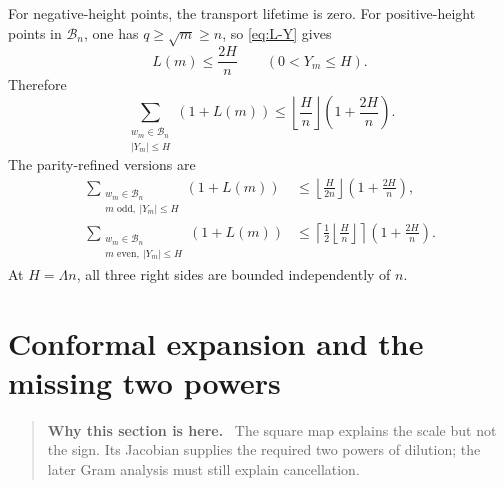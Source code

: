 \documentclass[11pt]{article}
\theoremstyle{definition}
\theoremstyle{remark}
\newcommand{\1}{\mathbf{1}}
\newenvironment{motivation}
  {\begin{quote}\small\color{ovvogray}\textbf{Why this section is here.}\ }
  {\end{quote}}
\begin{document}
For negative-height points, the transport lifetime is zero.  For
positive-height points in $\mathscr B_n$, one has
$q\ge\sqrt m\ge n$, so \cref{eq:L-Y} gives
\begin{equation}
 L(m)\le\frac{2H}{n}
 \qquad(0<Y_m\le H).
 \label{eq:L-H-n}
\end{equation}
Therefore
\begin{equation}
 \boxed{
 \sum_{\substack{w_m\in\mathscr B_n\\|Y_m|\le H}}
 (1+L(m))
 \le
 \left\lfloor\frac{H}{n}\right\rfloor
 \left(1+\frac{2H}{n}\right).
 }
 \label{eq:space-time-budget}
\end{equation}
The parity-refined versions are
\begin{align}
 \sum_{\substack{w_m\in\mathscr B_n\\m\text{ odd},\ |Y_m|\le H}}
 (1+L(m))
 &\le
 \left\lfloor\frac{H}{2n}\right\rfloor
 \left(1+\frac{2H}{n}\right),
 \label{eq:odd-space-time-budget}\\
 \sum_{\substack{w_m\in\mathscr B_n\\m\text{ even},\ |Y_m|\le H}}
 (1+L(m))
 &\le
 \left\lceil\frac{1}{2}
 \left\lfloor\frac{H}{n}\right\rfloor\right\rceil
 \left(1+\frac{2H}{n}\right).
 \label{eq:even-space-time-budget}
\end{align}
At $H=\Lambda n$, all three right sides are bounded independently of
$n$.

\section{Conformal expansion and the missing two powers}
\label{sec:jacobian}

\begin{motivation}
The square map explains the scale but not the sign.  Its Jacobian supplies the required two powers of dilution; the later Gram analysis must still explain cancellation.
\end{motivation}
\end{document}
